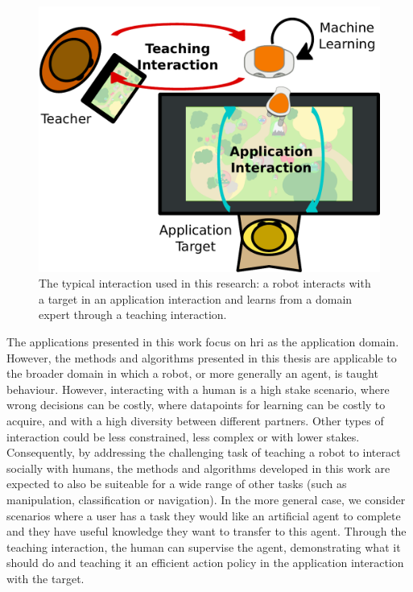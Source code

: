 \begin{figure}[ht]
	\includegraphics[width=.7\linewidth]{setup.pdf}
	\centering
	\caption{The typical interaction used in this research: a robot interacts with a target in an application interaction and learns from a domain expert through a teaching interaction.}
	\label{fig:intro_setup}
\end{figure}

The applications presented in this work focus on \gls{hri} as the application domain. However, the methods and algorithms presented in this thesis are applicable to the broader domain in which a robot, or more generally an agent, is taught behaviour. However, interacting with a human is a high stake scenario, where wrong decisions can be costly, where datapoints for learning can be costly to acquire, and with a high diversity between different partners. Other types of interaction could be less constrained, less complex or with lower stakes. Consequently, by addressing the challenging task of teaching a robot to interact socially with humans, the methods and algorithms developed in this work are expected to also be suiteable for a wide range of other tasks (such as manipulation, classification or navigation). In the more general case, we consider scenarios where a user has a task they would like an artificial agent to complete and they have useful knowledge they want to transfer to this agent. Through the teaching interaction, the human can supervise the agent, demonstrating what it should do and teaching it an efficient action policy in the application interaction with the target. 


